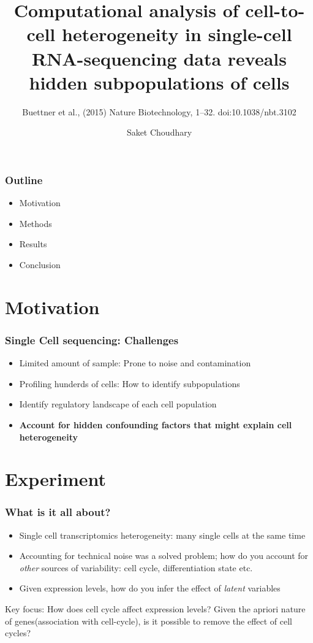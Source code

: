 \documentclass[10pt, compress]{beamer}
\title{Computational analysis of cell-to-cell heterogeneity in single-cell RNA-sequencing data reveals hidden subpopulations of cells}
\subtitle{Buettner et al., (2015) Nature Biotechnology, 1–32. doi:10.1038/nbt.3102}
\author[skc]{Saket Choudhary \inst{1}}
\institute{\inst{1} University of Southern California}
\date{\vspace*{50pt}
}
\renewcommand{\(}{\begin{columns}}
\renewcommand{\)}{\end{columns}}
\newcommand{\<}[1]{\begin{column}{#1}}
\renewcommand{\>}{\end{column}}
\begin{document}
\maketitle


\begin{frame}[fragile]
\frametitle{Outline}
\begin{itemize}
\item Motivation
\item Methods
\item Results
\item Conclusion
\end{itemize}
\end{frame}

\section{Motivation}
\begin{frame}[fragile]
\frametitle{Single Cell sequencing: Challenges}
\begin{itemize}
\item Limited amount of sample: Prone to noise and contamination
\item Profiling hunderds of cells: How to identify subpopulations 
\item Identify regulatory landscape of each cell population
\item \textbf{Account for hidden confounding factors that might explain cell heterogeneity}
\end{itemize}
\end{frame}

\section{Experiment}
\begin{frame}[fragile]
\frametitle{What is it all about?}
\begin{itemize}
\item Single cell transcriptomics heterogeneity: many single cells at the same time
\item Accounting for technical noise was a solved problem; how do you account for \textit{other} sources of variability: cell cycle,
differentiation state etc.
\item Given expression levels, how do you infer the effect of \textit{latent} variables
\end{itemize}
Key focus: How does cell cycle affect expression levels?
Given the apriori nature of genes(association with cell-cycle), is it possible to remove the effect of cell cycles?

\end{frame}
\end{document}
